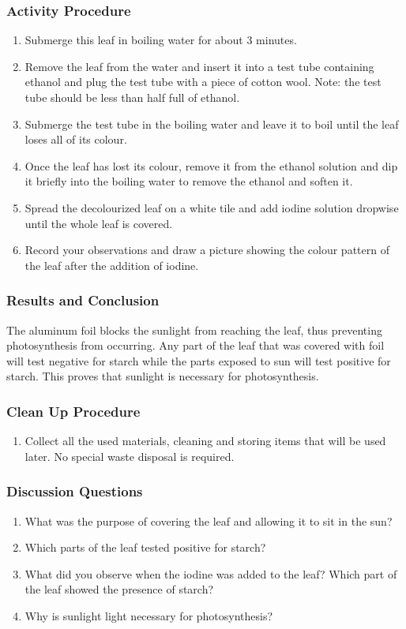 \subsubsection*{Activity Procedure}
\begin{enumerate}
\item{Submerge this leaf in boiling water for about 3 minutes.}
\item{Remove the leaf from the water and insert it into a test tube containing ethanol and plug the test tube with a piece of cotton wool. Note: the test tube should be less than half full of ethanol.}
\item{Submerge the test tube in the boiling water and leave it to boil until the leaf loses all of its colour.}
\item{Once the leaf has lost its colour, remove it from the ethanol solution and dip it briefly into the boiling water to remove the ethanol and soften it.}
\item{Spread the decolourized leaf on a white tile and add iodine solution dropwise until the whole leaf is covered.}
\item{ Record your observations and draw a picture showing the colour pattern of the leaf after the addition of iodine.}
\end{enumerate}

\subsubsection*{Results and Conclusion}
The aluminum foil blocks the sunlight from reaching the leaf, thus preventing photosynthesis from occurring. Any part of the leaf that was covered with foil will test negative for starch while the parts exposed to sun will test positive for starch. This proves that sunlight is necessary for photosynthesis.

\subsubsection*{Clean Up Procedure}
\begin{enumerate}
\item{Collect all the used materials, cleaning and storing items that will be used later. No special waste disposal is required.}
\end{enumerate}

\subsubsection*{Discussion Questions}
\begin{enumerate}
\item{What was the purpose of covering the leaf and allowing it to sit in the sun?}
\item{Which parts of the leaf tested positive for starch?}
\item{What did you observe when the iodine was added to the leaf? Which part of the leaf showed the presence of starch?}
\item{Why is sunlight light necessary for photosynthesis?}
\end{enumerate}

